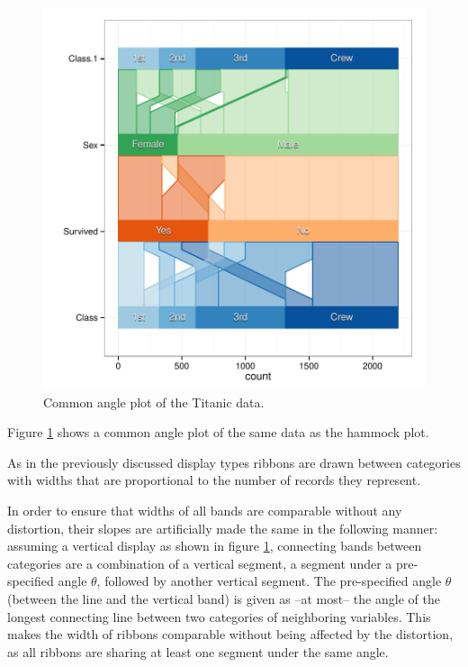 \begin{figure}[htbp] %
   \centering
   \includegraphics[width=\linewidth]{images/ca-titanic} 
   \caption{ \label{fig:ca-titanic} Common angle plot of the Titanic data. }
  \end{figure}

Figure \ref{fig:ca-titanic} shows a common angle plot of the same data as the hammock plot.

As in the previously discussed display types ribbons are drawn between categories with widths  that are proportional to  the number of records they represent.

In order to ensure that  widths of all bands are  comparable without any distortion, their slopes  are artificially made the same in the following manner: 
assuming a vertical display as shown in figure \ref{fig:ca-titanic},  connecting bands between  categories  are a combination of a vertical  segment, a  segment under a pre-specified angle $\theta$, followed by another vertical  segment.  
The pre-specified angle $\theta$ (between the line and the vertical band) is given as --at most-- the angle of the longest connecting line between two categories of neighboring variables. 
This makes the width of ribbons  comparable without being affected by the distortion, as all ribbons are sharing at least one segment under the same angle. 


